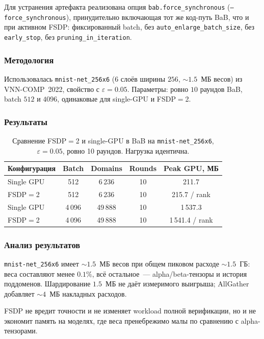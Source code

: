 Для устранения артефакта реализована опция
\texttt{bab.force\_synchronous} (\texttt{--force\_synchronous}),
принудительно включающая тот же код-путь BaB, что и при активном
FSDP: фиксированный batch, без \texttt{auto\_enlarge\_batch\_size},
без \texttt{early\_stop}, без \texttt{pruning\_in\_iteration}.

\subsubsection{Методология}

Использовалась \texttt{mnist-net\_256x6} ($6$ слоёв ширины $256$,
$\sim\!1.5$~МБ весов) из VNN-COMP~2022, свойство с $\varepsilon = 0.05$.
Параметры: ровно $10$ раундов BaB, batch $512$ и $4096$,
одинаковые для single-GPU и FSDP$=$2.

\subsubsection{Результаты}

\begin{table}[htbp]
\centering
\caption{Сравнение FSDP$=$2 и single-GPU в BaB
на \texttt{mnist-net\_256x6}, $\varepsilon{=}0.05$,
ровно 10 раундов. Нагрузка идентична.}
\label{tab:fsdp-bab}
\begin{tabular}{lcccc}
\toprule
Конфигурация & Batch & Domains & Rounds & Peak GPU, МБ \\
\midrule
Single GPU  &   512 &   6\,236 & 10 &     211.7 \\
FSDP$=$2    &   512 &   6\,236 & 10 & 215.7 / rank \\
Single GPU  & 4\,096 &  49\,888 & 10 &   1\,537.3 \\
FSDP$=$2    & 4\,096 &  49\,888 & 10 & 1\,541.4 / rank \\
\bottomrule
\end{tabular}
\end{table}

\subsubsection{Анализ результатов}

\texttt{mnist-net\_256x6} имеет $\sim\!1.5$~МБ весов при общем
пиковом расходе $\sim\!1.5$~ГБ: веса составляют менее $0.1\%$,
всё остальное~--- alpha/beta-тензоры и история поддоменов.
Шардирование $1.5$~МБ не даёт измеримого выигрыша; AllGather
добавляет $\sim\!4$~МБ накладных расходов.

FSDP не вредит точности и не изменяет workload полной верификации,
но и не экономит память на моделях, где веса пренебрежимо малы
по сравнению с alpha-тензорами.

